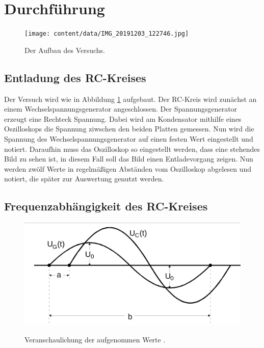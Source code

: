 \section{Durchführung}
\label{sec:Durchführung}
\begin{figure}
    \centering
    \caption{Der Aufbau des Versuchs.}
    \texttt{[image: content/data/IMG\_20191203\_122746.jpg]}
    \label{fig:aufbau}
\end{figure}

\subsection{Entladung des RC-Kreises}
\label{sec:1}
Der Versuch wird wie in Abbildung \ref{fig:aufbau} aufgebaut.
Der RC-Kreis wird zunächst an einem Wechselspannungsgenerator angeschlossen.
Der Spannungsgenerator erzeugt eine Rechteck Spannung.
Dabei wird am Kondensator mithilfe eines Oszilloskops die Spannung ziwschen den beiden Platten gemessen.
Nun wird die Spannung des Wechselspannungsgenerator auf einen festen Wert eingestellt und notiert.
Daraufhin muss das Oszilloskop so eingestellt werden, dass eine stehendes Bild zu sehen ist, in diesem Fall soll das Bild einen Entladevorgang zeigen.
Nun werden zwölf Werte in regelmäßigen Abständen vom Oszilloskop abgelesen und notiert, die später zur Auswertung genutzt werden.
\FloatBarrier
\subsection{Frequenzabhängigkeit des RC-Kreises}

\begin{figure}
    \centering
    \caption{Veranschaulichung der aufgenommen Werte \cite[S.282]{anleitung}.}
    \includegraphics[width=\textwidth]{content/data/a_und_b.jpg}
    \label{fig:a_und_b}
\end{figure}

